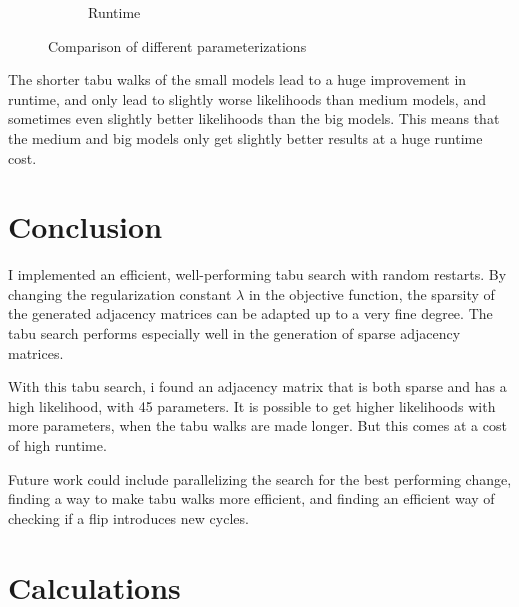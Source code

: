 \documentclass[sigconf, fleqn, prologue, dvipsnames]{acmart}
\begin{document}
\begin{figure}
\begin{subfigure}{0.2\textwidth}
		\caption{Runtime}
		\label{fig:results:smaller:times}
	\end{subfigure}
	\caption{Comparison of different parameterizations}
	\label{fig:results:smaller:parameterizations}
\end{figure}

The shorter tabu walks of the small models lead to a huge improvement in runtime, and only lead to slightly worse likelihoods than medium models, and sometimes even slightly better likelihoods than the big models.
This means that the medium and big models only get slightly better results at a huge runtime cost.


\section{Conclusion}
I implemented an efficient, well-performing tabu search with random restarts.
By changing the regularization constant $\lambda$ in the objective function, the sparsity of the generated adjacency matrices can be adapted up to a very fine degree.
The tabu search performs especially well in the generation of sparse adjacency matrices.

With this tabu search, i found an adjacency matrix that is both sparse and has a high likelihood, with 45 parameters.
It is possible to get higher likelihoods with more parameters, when the tabu walks are made longer. But this comes at a cost of high runtime.

Future work could include parallelizing the search for the best performing change, finding a way to make tabu walks more efficient, and finding an efficient way of checking if a flip introduces new cycles.

\typeout{}




\clearpage
\appendix
\section{Calculations}
\end{document}
